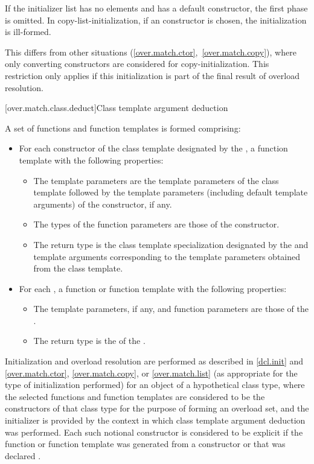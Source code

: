 If the initializer list has no elements and  has a default constructor,
the first phase is omitted.
In copy-list-initialization, if an  constructor is
chosen, the initialization is ill-formed. \begin{note}
This differs from other situations (\ref{over.match.ctor},~\ref{over.match.copy}),
where only converting constructors are considered for copy-initialization.
This restriction only
applies if this initialization is part of the final result of overload
resolution. \end{note}

[over.match.class.deduct]{Class template argument deduction}%
%

\pnum
A set of functions and function templates is formed comprising:

\begin{itemize}
\item
For each constructor
of the class template
designated by the ,
a function template with the following properties:
\begin{itemize}
\item
The template parameters are the template parameters of the class template
followed
by the template parameters (including default template arguments) of the constructor,
if any.
\item
The types of the function parameters are those of the constructor.
\item
The return type is the class template specialization
designated by the 
and template arguments
corresponding to the template parameters
obtained from the class template.
\end{itemize}

\item
For each ,
a function or function template
with the following properties:

\begin{itemize}
\item
The template parameters, if any,
and function parameters
are those of the .
\item
The return type
is the 
of the .
\end{itemize}
\end{itemize}

\pnum
Initialization and overload resolution are performed as described
in \ref{dcl.init} and \ref{over.match.ctor}, \ref{over.match.copy},
or \ref{over.match.list} (as appropriate for the type of initialization
performed) for an object of a hypothetical class type, where
the selected functions and function templates are considered to be the
constructors of that class type for the purpose of forming an overload
set, and the initializer is provided by the context in which class
template argument deduction was performed. Each such notional constructor
is considered to be explicit if the function or function template was
generated from a constructor or  that was
declared .

